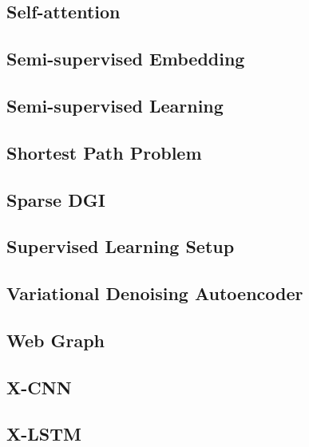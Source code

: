 \documentclass{article}
\newcommand{\example}[1]{
\resizebox{\linewidth}{!}{

}

}
\begin{document}
\subsection{Self-attention}
\example{self-attention}
\subsection{Semi-supervised Embedding}
\example{semi-supervised_embedding}
\subsection{Semi-supervised Learning}
\example{semi-supervised_learning}
\subsection{Shortest Path Problem}
\example{shortest_path_problem}
\subsection{Sparse DGI}
\example{sparse_dgi}
\subsection{Supervised Learning Setup}
\example{supervised_learning_setup}
\subsection{Variational Denoising Autoencoder}
\example{variational_denoising_autoencoder}
\subsection{Web Graph}
\example{web_graph}
\subsection{X-CNN}
\example{x-cnn}
\subsection{X-LSTM}
\example{x-lstm}
\end{document}
